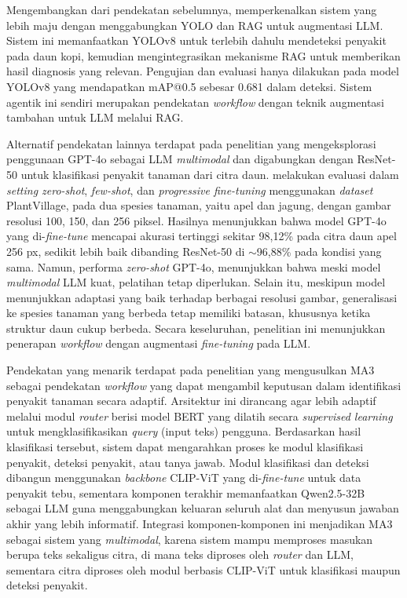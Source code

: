 Mengembangkan dari pendekatan sebelumnya, \textcite{mondalVisionMeetsLanguage2025} memperkenalkan sistem yang lebih maju dengan menggabungkan YOLO dan RAG untuk augmentasi LLM. Sistem ini memanfaatkan YOLOv8 untuk terlebih dahulu mendeteksi penyakit pada daun kopi, kemudian mengintegrasikan mekanisme RAG untuk memberikan hasil diagnosis yang relevan. Pengujian dan evaluasi hanya dilakukan pada model YOLOv8 yang mendapatkan mAP@0.5 sebesar 0.681 dalam deteksi. Sistem agentik ini sendiri merupakan pendekatan \textit{workflow} dengan teknik augmentasi tambahan untuk LLM melalui RAG.

Alternatif pendekatan lainnya terdapat pada penelitian \textcite{roumeliotisPlantDiseaseDetection2025} yang mengeksplorasi penggunaan GPT-4o sebagai LLM \textit{multimodal} dan digabungkan dengan ResNet-50 untuk klasifikasi penyakit tanaman dari citra daun. \citeauthor{roumeliotisPlantDiseaseDetection2025} melakukan evaluasi dalam \textit{setting zero-shot}, \textit{few-shot}, dan \textit{progressive fine-tuning} menggunakan \textit{dataset} PlantVillage, pada dua spesies tanaman, yaitu apel dan jagung, dengan gambar resolusi 100, 150, dan 256 piksel. Hasilnya menunjukkan bahwa model GPT-4o yang di-\textit{fine-tune} mencapai akurasi tertinggi sekitar 98,12\% pada citra daun apel 256 px, sedikit lebih baik dibanding ResNet-50 di $\sim$96,88\% pada kondisi yang sama. Namun, performa \textit{zero-shot} GPT-4o, menunjukkan bahwa meski model \textit{multimodal} LLM kuat, pelatihan tetap diperlukan. Selain itu, meskipun model menunjukkan adaptasi yang baik terhadap berbagai resolusi gambar, generalisasi ke spesies tanaman yang berbeda tetap memiliki batasan, khususnya ketika struktur daun cukup berbeda. Secara keseluruhan, penelitian ini menunjukkan penerapan \textit{workflow} dengan augmentasi \textit{fine-tuning} pada LLM.

Pendekatan yang menarik terdapat pada penelitian \textcite{xuMultimodalAgriculturalAgent2025} yang mengusulkan MA3 sebagai pendekatan \textit{workflow} yang dapat mengambil keputusan dalam identifikasi penyakit tanaman secara adaptif. Arsitektur ini dirancang agar lebih adaptif melalui modul \textit{router} berisi model BERT yang dilatih secara \textit{supervised learning} untuk mengklasifikasikan \textit{query} (input teks) pengguna. Berdasarkan hasil klasifikasi tersebut, sistem dapat mengarahkan proses ke modul klasifikasi penyakit, deteksi penyakit, atau tanya jawab. Modul klasifikasi dan deteksi dibangun menggunakan \textit{backbone} CLIP-ViT yang di-\textit{fine-tune} untuk data penyakit tebu, sementara komponen terakhir memanfaatkan Qwen2.5-32B sebagai LLM guna menggabungkan keluaran seluruh alat dan menyusun jawaban akhir yang lebih informatif. Integrasi komponen-komponen ini menjadikan MA3 sebagai sistem yang \textit{multimodal}, karena sistem mampu memproses masukan berupa teks sekaligus citra, di mana teks diproses oleh \textit{router} dan LLM, sementara citra diproses oleh modul berbasis CLIP-ViT untuk klasifikasi maupun deteksi penyakit.

